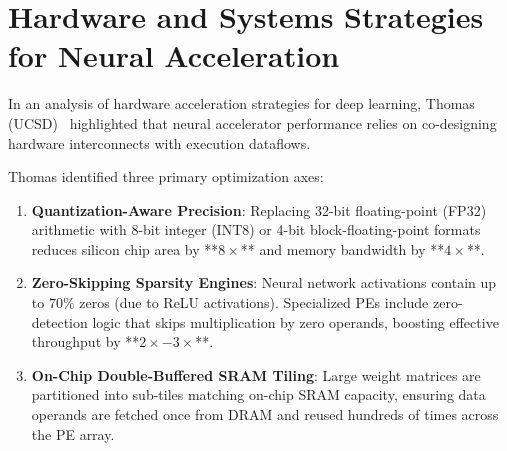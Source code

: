 \section{Hardware and Systems Strategies for Neural Acceleration}
In an analysis of hardware acceleration strategies for deep learning, Thomas (UCSD)~\cite{thomas2020hardware} highlighted that neural accelerator performance relies on co-designing hardware interconnects with execution dataflows.

Thomas identified three primary optimization axes:
\begin{enumerate}[leftmargin=*]
    \item \textbf{Quantization-Aware Precision}: Replacing 32-bit floating-point (FP32) arithmetic with 8-bit integer (INT8) or 4-bit block-floating-point formats reduces silicon chip area by **$8\times$** and memory bandwidth by **$4\times$**.
    \item \textbf{Zero-Skipping Sparsity Engines}: Neural network activations contain up to $70\%$ zeros (due to ReLU activations). Specialized PEs include zero-detection logic that skips multiplication by zero operands, boosting effective throughput by **$2\times - 3\times$**.
    \item \textbf{On-Chip Double-Buffered SRAM Tiling}: Large weight matrices are partitioned into sub-tiles matching on-chip SRAM capacity, ensuring data operands are fetched once from DRAM and reused hundreds of times across the PE array.
\end{enumerate}
